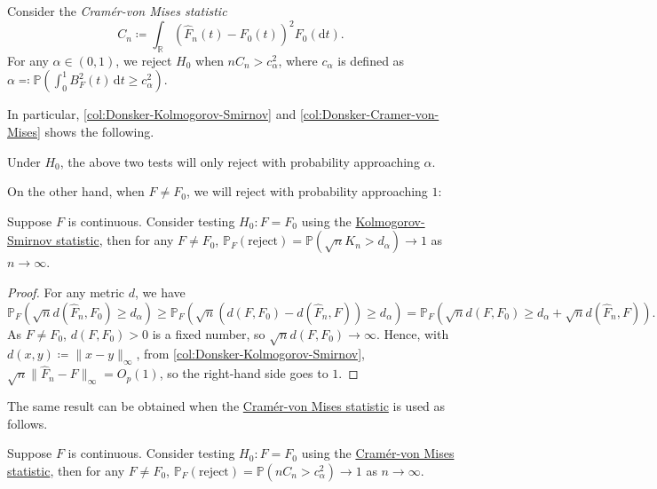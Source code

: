 \begin{eg}\label{eg:goodness-of-fit-Cramér-von-Mises}
	Consider the \emph{Cramér-von Mises statistic}
	\[
		C_n \coloneqq \int _\mathbb{R} \left( \hat{F} _n(t) - F_0(t) \right) ^2 F_0(\mathrm{d} t).
	\]
	For any \(\alpha \in (0, 1)\), we reject \(H_0\) when \(n C_n > c_{\alpha }^2\), where \(c_\alpha \) is defined as \(\alpha \eqqcolon \mathbb{P} (\int_{0}^{1} B_F^2(t) \,\mathrm{d}t \geq c_\alpha ^2)\).
\end{eg}
In particular, \autoref{col:Donsker-Kolmogorov-Smirnov} and \autoref{col:Donsker-Cramer-von-Mises} shows the following.

\begin{remark}
	Under \(H_0\), the above two tests will only reject with probability approaching \(\alpha \).
\end{remark}

On the other hand, when \(F \neq F_0\), we will reject with probability approaching \(1\):

\begin{proposition}\label{prop:goodness-of-fit-Kolmogorov-Smirnov}
	Suppose \(F\) is continuous. Consider testing \(H_0 \colon F = F_0\) using the \hyperref[eg:goodness-of-fit-Kolmogorov-Smirnov]{Kolmogorov-Smirnov statistic}, then for any \(F \neq F_0\), \(\mathbb{P} _F(\text{reject} ) = \mathbb{P} (\sqrt{n} K_n > d_\alpha ) \to 1\) as \(n \to \infty \).
\end{proposition}
\begin{proof}
	For any metric \(d\), we have
	\[
		\mathbb{P} _F (\sqrt{n} d(\hat{F} _n, F_0) \geq d_\alpha )
		\geq \mathbb{P} _F(\sqrt{n} (d(F, F_0) - d(\hat{F} _n, F))\geq d_\alpha )
		= \mathbb{P} _F(\sqrt{n} d(F, F_0) \geq d_\alpha + \sqrt{n} d(\hat{F} _n, F)).
	\]
	As \(F \neq F_0\), \(d(F, F_0) > 0\) is a fixed number, so \(\sqrt{n} d(F, F_0) \to \infty \). Hence, with \(d(x, y) \coloneqq \lVert x - y \rVert _\infty \), from \autoref{col:Donsker-Kolmogorov-Smirnov}, \(\sqrt{n} \lVert \hat{F} _n - F \rVert _\infty = O_p(1)\), so the right-hand side goes to \(1\).
\end{proof}

The same result can be obtained when the \hyperref[eg:goodness-of-fit-Cramér-von-Mises]{Cramér-von Mises statistic} is used as follows.

\begin{proposition}\label{prop:goodness-of-fit-Cramér-von-Mises}
	Suppose \(F\) is continuous. Consider testing \(H_0 \colon F = F_0\) using the \hyperref[eg:goodness-of-fit-Cramér-von-Mises]{Cramér-von Mises statistic}, then for any \(F \neq F_0\), \(\mathbb{P} _F(\text{reject} ) = \mathbb{P} (n C_n > c_\alpha ^2) \to 1\) as \(n \to \infty \).
\end{proposition}

